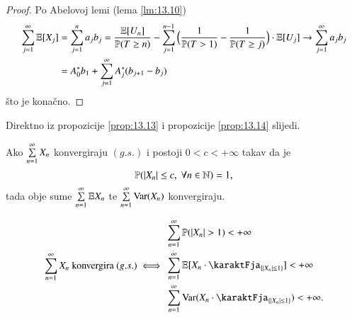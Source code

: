 \begin{proof}
    Po Abelovoj lemi (lema \ref{lm:13.10})
    \begin{equation*}
        \begin{aligned}
            \sum\limits_{j = 1}^{\infty} \mathbb{E} [X_j] &= \sum\limits_{j = 1}^{n} a_j b_j = \frac{\mathbb{E} [U_n]}{\mathbb{P}({T \geq n})} - \sum\limits_{j = 1}^{n - 1} \Big( \frac{1}{\mathbb{P}({T > 1})} - \frac{1}{\mathbb{P}({T \geq j})} \Big) \cdot \mathbb{E} [U_j] \to \sum\limits_{j = 1}^{\infty} a_j b_j\\
            &= A_0^* b_1 + \sum\limits_{j = 1}^{\infty} A_j^* (b_{j + 1} - b_j)
        \end{aligned}
    \end{equation*}
    \v sto je kona\v cno.
\end{proof}

Direktno iz propozicije \ref{prop:13.13} i propozicije \ref{prop:13.14} slijedi.

\begin{kor} \label{kor:13.15}
    Ako $\sum\limits_{n = 1}^{\infty} X_n$ konvergiraju $(g.s.)$ i postoji $0 < c < +\infty$ takav da je
    \begin{equation*}
        \mathbb{P}({|X_n| \leq c, \; \forall n \in \mathbb{N}}) = 1,
    \end{equation*}
    tada obje sume $\sum\limits_{n = 1}^{\infty} \mathbb{E} X_n$ te $\sum\limits_{n = 1}^{\infty} \mathrm{Var} (X_n)$ konvergiraju.
\end{kor}

\begin{tm}    \label{tm:13.16}
    \begin{equation*}
        \suma{n = 1}{\infty} X_n \textnormal{ konvergira } (g.s.)
        \iff
        \begin{aligned}
            &\suma{n = 1}{\infty} \masP (|X_n| > 1) < +\infty\\
            &\suma{n = 1}{\infty} \masE [X_n \cdot \karaktFja_{\{ |X_n| \leq 1 \}}] < +\infty\\
            &\suma{n = 1}{\infty} \Var (X_n \cdot \karaktFja_{\{ |X_n| \leq 1 \}}) < + \infty.
        \end{aligned}
    \end{equation*}
\end{tm}

